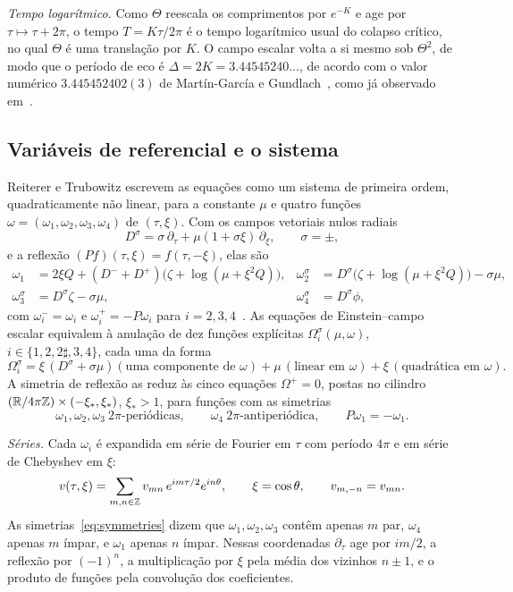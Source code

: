 \emph{Tempo logarítmico.} Como $\Theta$ reescala os comprimentos por $e^{-K}$ e age por $\tau\mapsto\tau+2\pi$,
o tempo $T=K\tau/2\pi$ é o tempo logarítmico usual do colapso crítico, no qual $\Theta$ é uma
translação por $K$. O campo escalar volta a si mesmo sob $\Theta^2$, de modo que o período de eco é
$\Delta=2K=3.44545240\ldots$, de acordo com o valor numérico $3.445452402(3)$ de
Mart\'in-Garc\'ia e Gundlach~\cite{MartinGarciaGundlach2003}, como já observado em~\cite{RT2019}.

\subsection{Variáveis de referencial e o sistema}\label{sec:setting-system}

Reiterer e Trubowitz escrevem as equações como um sistema de primeira ordem, quadraticamente não linear, para a
constante $\mu$ e quatro funções $\omega=(\omega_1,\omega_2,\omega_3,\omega_4)$ de $(\tau,\xi)$. Com os
campos vetoriais nulos radiais
\[
  D^\sigma=\sigma\,\partial_\tau+\mu(1+\sigma\xi)\,\partial_\xi,\qquad\sigma=\pm,
\]
e a reflexão $(Pf)(\tau,\xi)=f(\tau,-\xi)$, elas são
\begin{equation}\label{eq:omega}
\begin{aligned}
  \omega_1&=2\xi Q+(D^-+D^+)\big(\zeta+\log(\mu+\xi^2Q)\big),&
  \omega_2^\sigma&=D^\sigma\big(\zeta+\log(\mu+\xi^2Q)\big)-\sigma\mu,\\
  \omega_3^\sigma&=D^\sigma\zeta-\sigma\mu,&
  \omega_4^\sigma&=D^\sigma\phi,
\end{aligned}
\end{equation}
com $\omega_i^-=\omega_i$ e $\omega_i^+=-P\omega_i$ para $i=2,3,4$~\cite[\S2]{RT2019}. As equações de
Einstein--campo escalar equivalem à anulação de dez funções explícitas
$\Omega_i^\sigma(\mu,\omega)$, $i\in\{1,2,2\sharp,3,4\}$, cada uma da forma
\[
  \Omega_i^\sigma=\xi\,(D^\sigma+\sigma\mu)(\text{uma componente de }\omega)
  +\mu\,(\text{linear em }\omega)+\xi\,(\text{quadrática em }\omega).
\]
A simetria de reflexão as reduz às cinco equações $\Omega^+=0$, postas no cilindro
$(\mathbb{R}/4\pi\mathbb{Z})\times(-\xi_*,\xi_*)$, $\xi_*>1$, para funções com as simetrias
\begin{equation}\label{eq:symmetries}
  \omega_1,\omega_2,\omega_3\ \text{$2\pi$-periódicas},\qquad \omega_4\ \text{$2\pi$-antiperiódica},\qquad
  P\omega_1=-\omega_1.
\end{equation}

\emph{Séries.} Cada $\omega_i$ é expandida em série de Fourier em $\tau$ com período $4\pi$ e em série de
Chebyshev em $\xi$:
\begin{equation}\label{eq:series}
  v(\tau,\xi)=\sum_{m,n\in\mathbb{Z}}v_{mn}\,e^{im\tau/2}e^{in\theta},\qquad \xi=\cos\theta,\qquad
  v_{m,-n}=v_{mn}.
\end{equation}
As simetrias~\eqref{eq:symmetries} dizem que $\omega_1,\omega_2,\omega_3$ contêm apenas $m$ par,
$\omega_4$ apenas $m$ ímpar, e $\omega_1$ apenas $n$ ímpar. Nessas coordenadas $\partial_\tau$ age por
$im/2$, a reflexão por $(-1)^n$, a multiplicação por $\xi$ pela média dos vizinhos $n\pm1$, e o
produto de funções pela convolução dos coeficientes.


